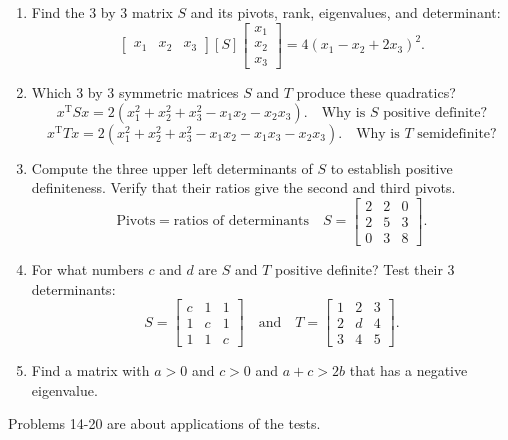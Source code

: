 \documentclass[14pt, a4paper]{article}
\begin{document}
\begin{enumerate}
    \item Find the 3 by 3 matrix $S$ and its pivots, rank, eigenvalues, and determinant:
          \[
              \begin{bmatrix} x_1 & x_2 & x_3 \end{bmatrix} [S] \begin{bmatrix} x_1 \\ x_2 \\ x_3 \end{bmatrix} = 4(x_1 - x_2 + 2x_3)^2.
          \]

    \item Which 3 by 3 symmetric matrices $S$ and $T$ produce these quadratics?
          \[
              x^{\mathrm{T}}Sx = 2(x_1^2 + x_2^2 + x_3^2 - x_1x_2 - x_2x_3). \quad \text{Why is } S \text{ positive definite?}
          \]
          \[
              x^{\mathrm{T}}Tx = 2(x_1^2 + x_2^2 + x_3^2 - x_1x_2 - x_1x_3 - x_2x_3). \quad \text{Why is } T \text{ semidefinite?}
          \]

    \item Compute the three upper left determinants of $S$ to establish positive definiteness. Verify that their ratios give the second and third pivots.
          \[
              \text{Pivots} = \text{ratios of determinants} \quad S = \begin{bmatrix} 2 & 2 & 0 \\ 2 & 5 & 3 \\ 0 & 3 & 8 \end{bmatrix}.
          \]

    \item For what numbers $c$ and $d$ are $S$ and $T$ positive definite? Test their 3 determinants:
          \[
              S = \begin{bmatrix} c & 1 & 1 \\ 1 & c & 1 \\ 1 & 1 & c \end{bmatrix} \quad \text{and} \quad T = \begin{bmatrix} 1 & 2 & 3 \\ 2 & d & 4 \\ 3 & 4 & 5 \end{bmatrix}.
          \]

    \item Find a matrix with $a > 0$ and $c > 0$ and $a + c > 2b$ that has a negative eigenvalue.

\end{enumerate}
\noindent Problems 14-20 are about applications of the tests.
\end{document}
